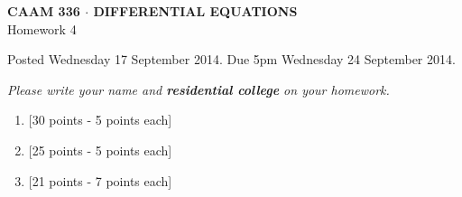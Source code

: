 \documentclass[10pt]{article}
\begin{document}
\vspace*{-5em}
\begin{center}
\large \textsf{\textbf{CAAM 336 $\cdot$ DIFFERENTIAL EQUATIONS}\\[0.5em]
Homework 4 }
\end{center}

Posted Wednesday 17 September 2014.  Due 5pm Wednesday 24 September 2014.

\begin{center}
\emph{Please write your name and \textbf{residential college} on your homework.}
\end{center}

\begin{enumerate}
\item {[30 points - 5 points each]}\\   
\vspace{1cm}
\item {[25 points - 5 points each]}\\  
\newpage
\vspace{1em}
\item {[21 points - 7 points each]}\\  
\end{enumerate}
\end{document}
